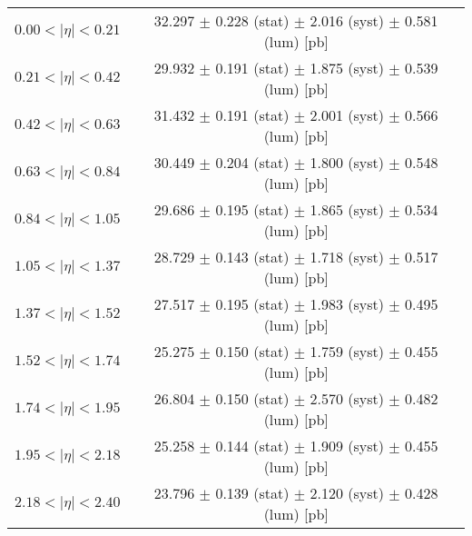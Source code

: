 \begin{tabular}{lc}
\hline
$0.00 < |\eta| <0.21$          & 32.297 $\pm$ 0.228 (stat) $\pm$ 2.016 (syst) $\pm$ 0.581 (lum) [pb]  \\
$0.21 < |\eta| <0.42$          & 29.932 $\pm$ 0.191 (stat) $\pm$ 1.875 (syst) $\pm$ 0.539 (lum) [pb]  \\
$0.42 < |\eta| <0.63$          & 31.432 $\pm$ 0.191 (stat) $\pm$ 2.001 (syst) $\pm$ 0.566 (lum) [pb]  \\
$0.63 < |\eta| <0.84$          & 30.449 $\pm$ 0.204 (stat) $\pm$ 1.800 (syst) $\pm$ 0.548 (lum) [pb]  \\
$0.84 < |\eta| <1.05$          & 29.686 $\pm$ 0.195 (stat) $\pm$ 1.865 (syst) $\pm$ 0.534 (lum) [pb]  \\
$1.05 < |\eta| <1.37$          & 28.729 $\pm$ 0.143 (stat) $\pm$ 1.718 (syst) $\pm$ 0.517 (lum) [pb]  \\
$1.37 < |\eta| <1.52$          & 27.517 $\pm$ 0.195 (stat) $\pm$ 1.983 (syst) $\pm$ 0.495 (lum) [pb]  \\
$1.52 < |\eta| <1.74$          & 25.275 $\pm$ 0.150 (stat) $\pm$ 1.759 (syst) $\pm$ 0.455 (lum) [pb]  \\
$1.74 < |\eta| <1.95$          & 26.804 $\pm$ 0.150 (stat) $\pm$ 2.570 (syst) $\pm$ 0.482 (lum) [pb]  \\
$1.95 < |\eta| <2.18$          & 25.258 $\pm$ 0.144 (stat) $\pm$ 1.909 (syst) $\pm$ 0.455 (lum) [pb]  \\
$2.18 < |\eta| <2.40$          & 23.796 $\pm$ 0.139 (stat) $\pm$ 2.120 (syst) $\pm$ 0.428 (lum) [pb]  \\
\hline
\end{tabular}
